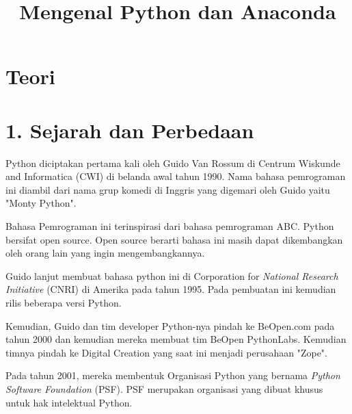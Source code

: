 \clearpage
\setcounter{page}{1}

\begin{center}
\title{\LARGE \bf Mengenal Python dan Anaconda}
\end{center}

\appendix
\section{Teori}

\section*{\normalsize 1. Sejarah dan Perbedaan}

\hspace {\parindent} Python diciptakan pertama kali oleh Guido Van Rossum di Centrum Wiskunde and Informatica (CWI) di belanda awal tahun 1990. Nama bahasa pemrograman ini diambil dari nama grup komedi di Inggris yang digemari oleh Guido yaitu "Monty Python". 

Bahasa Pemrograman ini terinspirasi dari bahasa pemrograman ABC. Python bersifat open source. Open source berarti bahasa ini masih dapat dikembangkan oleh orang lain yang ingin mengembangkannya.

Guido lanjut membuat bahasa python ini di Corporation for \textit{National Research Initiative} (CNRI) di Amerika pada tahun 1995. Pada pembuatan ini kemudian rilis beberapa versi Python. 

Kemudian, Guido dan tim developer Python-nya pindah ke BeOpen.com pada tahun 2000 dan kemudian mereka membuat tim BeOpen PythonLabs. Kemudian timnya pindah ke Digital Creation yang saat ini menjadi perusahaan "Zope". 

Pada tahun 2001, mereka membentuk Organisasi Python yang bernama \textit{Python Software Foundation} (PSF). PSF merupakan organisasi yang dibuat khusus untuk hak intelektual Python.

